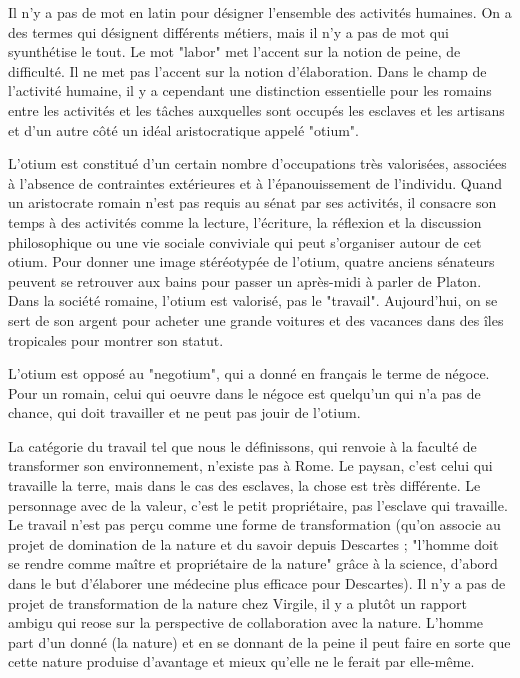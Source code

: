 \documentclass[a4paper,12pt]{book}
\begin{document}
\par Il n'y a pas de mot en latin pour désigner l'ensemble des activités humaines. On a des termes qui désignent différents métiers, mais il n'y a pas de mot qui syunthétise le tout. Le mot "labor" met l'accent sur la notion de peine, de difficulté. Il ne met pas l'accent sur la notion d'élaboration. Dans le champ de l'activité humaine, il y a cependant une distinction essentielle pour les romains entre les activités et les tâches auxquelles sont occupés les esclaves et les artisans et d'un autre côté un idéal aristocratique appelé "otium".
\par L'otium est constitué d'un certain nombre d'occupations très valorisées, associées à l'absence de contraintes extérieures et à l'épanouissement de l'individu. Quand un aristocrate romain n'est pas requis au sénat par ses activités, il consacre son temps à des activités comme la lecture, l'écriture, la réflexion et la discussion philosophique ou une vie sociale conviviale qui peut s'organiser autour de cet otium. Pour donner une image stéréotypée de l'otium, quatre anciens sénateurs peuvent se retrouver aux bains pour passer un après-midi à parler de Platon. Dans la société romaine, l'otium est valorisé, pas le "travail". Aujourd'hui, on se sert de son argent pour acheter une grande voitures et des vacances dans des îles tropicales pour montrer son statut.
\par L'otium est opposé au "negotium", qui a donné en français le terme de négoce. Pour un romain, celui qui oeuvre dans le négoce est quelqu'un qui n'a pas de chance, qui doit travailler et ne peut pas jouir de l'otium.
\par La catégorie du travail tel que nous le définissons, qui renvoie à la faculté de transformer son environnement, n'existe pas à Rome. Le paysan, c'est celui qui travaille la terre, mais dans le cas des esclaves, la chose est très différente. Le personnage avec de la valeur, c'est le petit propriétaire, pas l'esclave qui travaille. Le travail n'est pas perçu comme une forme de transformation (qu'on associe au projet de domination de la nature et du savoir depuis Descartes ; "l'homme doit se rendre comme maître et propriétaire de la nature" grâce à la science, d'abord dans le but d'élaborer une médecine plus efficace pour Descartes). Il n'y a pas de projet de transformation de la nature chez Virgile, il y a plutôt un rapport ambigu qui reose sur la perspective de collaboration avec la nature. L'homme part d'un donné (la nature) et en se donnant de la peine il peut faire en sorte que cette nature produise d'avantage et mieux qu'elle ne le ferait par elle-même.
\end{document}
